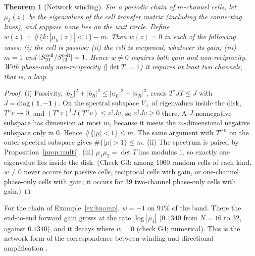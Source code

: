 \documentclass[11pt]{article}
\newtheorem{theorem}{Theorem}
\theoremstyle{definition}
\theoremstyle{remark}
\newcommand{\one}{\mathbf 1}
\begin{document}
\begin{theorem}[Network winding]\label{thm:winding}
For a periodic chain of $m$-channel cells, let $\mu_k(z)$ be the eigenvalues of the cell transfer matrix (including the connecting lines), and suppose none lies on the unit circle. Define $w(z)=\#\{k:|\mu_k(z)|<1\}-m$. Then $w(z)=0$ in each of the following cases: (i) the cell is passive; (ii) the cell is reciprocal, whatever its gain; (iii) $m=1$ and $|S^{\rm cell}_{21}/S^{\rm cell}_{12}|=1$. Hence $w\ne0$ requires both gain and non-reciprocity. With phase-only non-reciprocity ($|\det T|=1$) it requires at least two channels, that is, a loop.
\end{theorem}
\begin{proof}
(i) Passivity, $|b_L|^2+|b_R|^2\le|a_L|^2+|a_R|^2$, reads $T^\dagger JT\le J$ with $J=\mathrm{diag}(\one,-\one)$. On the spectral subspace $V_<$ of eigenvalues inside the disk, $T^nv\to0$, and $(T^nv)^\dagger J(T^nv)\le v^\dagger Jv$, so $v^\dagger Jv\ge0$ there. A $J$-nonnegative subspace has dimension at most $m$, because it meets the $m$-dimensional negative subspace only in $0$. Hence $\#\{|\mu|<1\}\le m$. The same argument with $T^{-n}$ on the outer spectral subspace gives $\#\{|\mu|>1\}\le m$. (ii) The spectrum is paired by Proposition~\ref{prop:multi}. (iii) $\mu_1\mu_2=\det T$ has modulus $1$, so exactly one eigenvalue lies inside the disk. (Check G3: among 1000 random cells of each kind, $w\ne0$ never occurs for passive cells, reciprocal cells with gain, or one-channel phase-only cells with gain; it occurs for 39 two-channel phase-only cells with gain.)
\end{proof}

For the chain of Example~\ref{ex:hnamp}, $w=-1$ on $91\%$ of the band. There the end-to-end forward gain grows at the rate $\log|\mu_1|$ ($0.1340$ from $N=16$ to $32$, against $0.1340$), and it decays where $w=0$ (check G4; numerical). This is the network form of the correspondence between winding and directional amplification \cite{ZRR21,WBN20}.
\end{document}
